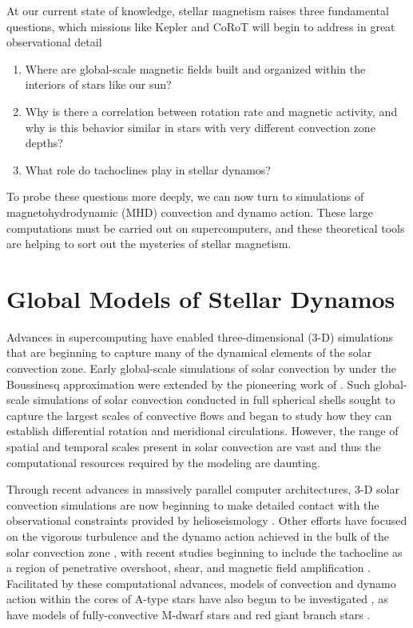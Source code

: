 At our current state of knowledge, stellar magnetism raises three fundamental
questions, which missions like Kepler and CoRoT will begin to address in great
observational detail
\begin{enumerate}
 \item      Where are global-scale magnetic fields built
           and organized within the interiors of stars like our sun?

 \item      Why is there a correlation between rotation rate and magnetic
           activity, and why is this behavior similar in stars with very
	   different convection zone depths?

 \item      What role do tachoclines play in stellar dynamos?
\end{enumerate}
To probe these questions more deeply, we can now turn to simulations
of magnetohydrodynamic (MHD) convection and dynamo action.  These large
computations must be carried out on supercomputers, and these 
theoretical tools are helping to sort out the mysteries of stellar
magnetism. 



\section{Global Models of Stellar Dynamos}
Advances in supercomputing have enabled three-dimensional (3-D)
simulations that are beginning to capture many of
the dynamical elements of the solar convection zone.  Early
global-scale simulations of solar convection by
\citet{Gilman_1975,Gilman_1977,Gilman_1979} under the Boussinesq
approximation were extended by the pioneering work of
\citet{Gilman&Glatzmaier_1981}.  Such global-scale simulations of solar 
convection conducted in full spherical shells sought to capture the largest
scales of convective flows and began to study how they can establish
differential rotation and meridional circulations.  However, the range of
spatial and temporal scales present in solar convection are vast and
thus the computational resources required by the modeling are daunting.

Through recent advances in massively parallel computer architectures,
3-D solar convection simulations are now beginning to make detailed contact with the
observational constraints provided by helioseismology \citep[e.g.,][]{
Brun&Toomre_2002, Miesch_et_al_2006, Miesch_et_al_2008}. Other efforts have focused on
the vigorous turbulence and the dynamo action achieved in the bulk of the 
solar convection zone \citep{Brun_et_al_2004}, with recent studies
beginning to include the tachocline as a region of penetrative
overshoot, shear, and magnetic field amplification \citep{Browning_et_al_2006}.  
Facilitated by these computational advances, models of convection and
dynamo action within the cores of A-type stars have also begun to be
investigated \citep{Browning_et_al_2004, Brun_et_al_2005,
  Featherstone_et_al_2007, Featherstone_et_al_2009}, as have models of fully-convective
M-dwarf stars \citep{Browning_2008} and red giant branch stars
\citep{Palacios&Brun_2007, Brun&Palacios_2009}.

